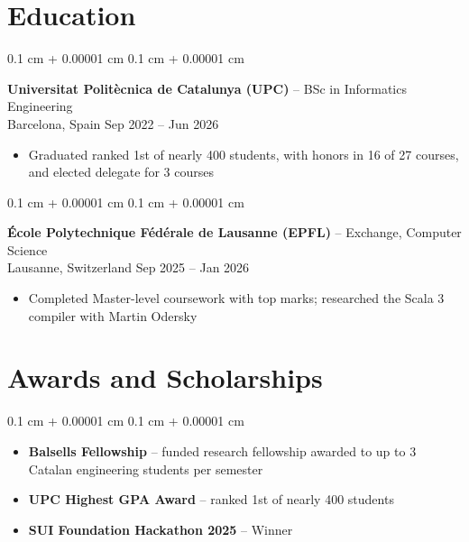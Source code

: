 \documentclass[10pt, letterpaper]{article}
\newenvironment{highlights}{
    \begin{itemize}[
        topsep=0.06 cm,
        parsep=0.06 cm,
        partopsep=0pt,
        itemsep=0pt,
        leftmargin=10pt
    ]
}{
    \end{itemize}
} %
\newenvironment{onecolentry}{
    \begin{adjustwidth}{
        0.1 cm + 0.00001 cm
    }{
        0.1 cm + 0.00001 cm
    }
}{
    \end{adjustwidth}
} %
\newenvironment{entry}{
    \begin{onecolentry}
}{
    \end{onecolentry}
} %
\newcommand{\locsep}{\quad\textbar\quad}
\begin{document}
    \section{Education}

        \begin{entry}
            \textbf{Universitat Polit\`ecnica de Catalunya (UPC)} -- BSc in Informatics Engineering \\
            Barcelona, Spain \locsep Sep 2022 -- Jun 2026
            \begin{highlights}
                \item Graduated ranked 1st of nearly 400 students, with honors in 16 of 27 courses, and elected delegate for 3 courses
            \end{highlights}
        \end{entry}

        \vspace{0.13 cm}

        \begin{entry}
            \textbf{\'Ecole Polytechnique F\'ed\'erale de Lausanne (EPFL)} -- Exchange, Computer Science \\
            Lausanne, Switzerland \locsep Sep 2025 -- Jan 2026
            \begin{highlights}
                \item Completed Master-level coursework with top marks; researched the Scala 3 compiler with Martin Odersky
            \end{highlights}
        \end{entry}


    \section{Awards and Scholarships}
        \begin{entry}
            \begin{highlights}
                \item \textbf{Balsells Fellowship} -- funded research fellowship awarded to up to 3 Catalan engineering students per semester
                \item \textbf{UPC Highest GPA Award} -- ranked 1st of nearly 400 students
                \item \textbf{SUI Foundation Hackathon 2025} -- Winner
            \end{highlights}
        \end{entry}
\end{document}
